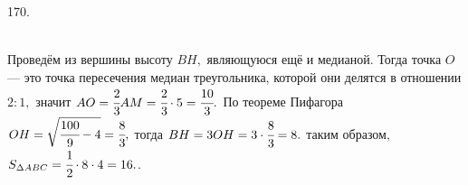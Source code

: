 \documentclass[12pt]{article}
\begin{document}
170. \begin{figure}[ht!]
\end{figure}\\
Проведём из вершины высоту $BH,$ являющуюся ещё и медианой. Тогда точка $O$ --- это точка пересечения медиан треугольника, которой они делятся в отношении $2:1,$ значит $AO=\cfrac{2}{3}AM=\cfrac{2}{3}\cdot5=\cfrac{10}{3}.$ По теореме Пифагора $OH=\sqrt{\cfrac{100}{9}-4}=\cfrac{8}{3},$ тогда $BH=3OH=3\cdot\cfrac{8}{3}=8.$ таким образом, $S_{\Delta ABC}=\cfrac{1}{2}\cdot8\cdot4=16.$\newpage{}. \begin{figure}[ht!]
\end{figure}\\
\end{document}
